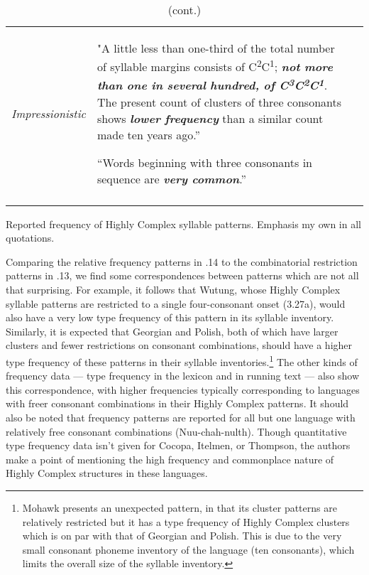 \begin{table}
\begin{tabularx}{\textwidth}{XXX}
\textit{Impressionistic} & "A little less than one-third of the total number of syllable margins consists of C\textsuperscript{2}C\textsuperscript{1}; \textbf{\textit{not} \textit{more} \textit{than} \textit{one} \textit{in} \textit{several} \textit{hundred,} \textit{of} \textit{C}}\textbf{\textit{\textsuperscript{3}}}\textbf{\textit{C}}\textbf{\textit{\textsuperscript{2}}}\textbf{\textit{C}}\textbf{\textit{\textsuperscript{1}}}. The present count of clusters of three consonants shows \textbf{\textit{lower} \textit{frequency}} than a similar count made ten years ago.” \citep[24]{Matteson1965}

“Words beginning with three consonants in sequence are \textbf{\textit{very} \textit{common}}.” \citep[26]{Hanson2010}\\
\lspbottomrule
\end{tabularx}
{{\caption{\label{tab:key:3.14} (cont.)} Reported frequency of Highly Complex syllable patterns. Emphasis my own in all quotations.}}
\end{table}

  Comparing the relative frequency patterns in .14 to the combinatorial restriction patterns in .13, we find some correspondences between patterns which are not all that surprising. For example, it follows that Wutung, whose Highly Complex syllable patterns are restricted to a single four-consonant onset (3.27a), would also have a very low type frequency of this pattern in its syllable inventory. Similarly, it is expected that Georgian and Polish, both of which have larger clusters and fewer restrictions on consonant combinations, should have a higher type frequency of these patterns in their syllable inventories.\footnote{ \textrm{Mohawk presents an unexpected pattern, in that its cluster patterns are relatively restricted but it has a type frequency of Highly Complex clusters which is on par with that of Georgian and Polish. This is due to the very small consonant phoneme inventory of the language (ten consonants), which limits the overall size of the syllable inventory.}} The other kinds of frequency data — type frequency in the lexicon and in running text — also show this correspondence, with higher frequencies typically corresponding to languages with freer consonant combinations in their Highly Complex patterns. It should also be noted that frequency patterns are reported for all but one language with relatively free consonant combinations (Nuu-chah-nulth). Though quantitative type frequency data isn’t given for Cocopa, Itelmen, or Thompson, the authors make a point of mentioning the high frequency and commonplace nature of Highly Complex structures in these languages. 

